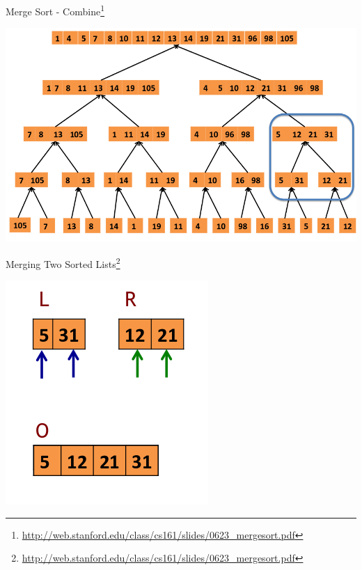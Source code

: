 \documentclass{beamer}
\begin{document}
\begin{frame}{Merge Sort - Combine\footnote{\url{http://web.stanford.edu/class/cs161/slides/0623_mergesort.pdf}}}
\begin{center}
    \includegraphics[scale=0.36]{mergeSortMerge.png}
\end{center}
\end{frame}


\begin{frame}{Merging Two Sorted Lists\footnote{\url{http://web.stanford.edu/class/cs161/slides/0623_mergesort.pdf}}}
\begin{center}
    \includegraphics[scale=0.5]{mergeListExample.png}
\end{center}
\end{frame}
\end{document}
